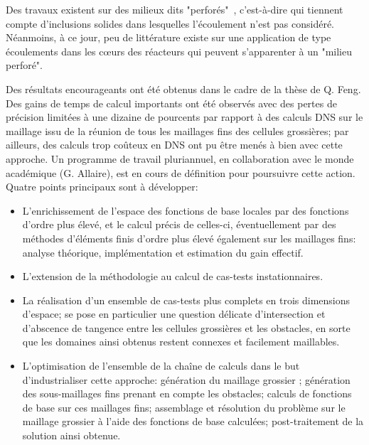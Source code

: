 Des travaux existent sur des milieux dits "perfor\'es"~\cite{Chung}, c'est-\`a-dire qui tiennent compte d'inclusions solides dans lesquelles l'\'ecoulement n'est pas consid\'er\'e. N\'eanmoins, \`a ce jour, peu de litt\'erature existe sur une application de type \'ecoulements dans les c{\oe}urs des r\'eacteurs qui peuvent s'apparenter \`a un "milieu perfor\'e". 

Des r\'esultats encourageants ont \'et\'e obtenus dans le cadre de la th\`ese de Q. Feng. Des gains de temps de calcul importants ont \'et\'e observ\'es avec des pertes de pr\'ecision limit\'ees \`a une dizaine de pourcents par rapport \`a des calculs DNS sur le maillage issu de la r\'eunion de tous les maillages fins des cellules grossi\`eres; par ailleurs, des calculs trop co\^uteux en DNS ont pu \^etre men\'es \`a bien avec cette approche. Un programme de travail pluriannuel, en collaboration avec le monde acad\'emique (G. Allaire), est en cours de d\'efinition pour poursuivre cette action. Quatre points principaux sont \`a d\'evelopper:
\begin{itemize}
\item L'enrichissement de l'espace des fonctions de base locales par des fonctions d'ordre plus \'elev\'e, et le calcul pr\'ecis de celles-ci, \'eventuellement par des m\'ethodes d'\'el\'ements finis d'ordre plus \'elev\'e \'egalement sur les maillages fins: analyse th\'eorique, impl\'ementation et estimation du gain effectif.
\item L'extension de la m\'ethodologie au calcul de cas-tests instationnaires.
\item La r\'ealisation d'un ensemble de cas-tests plus complets en trois dimensions d'espace; se pose en particulier une question d\'elicate d'intersection et d'abscence de tangence entre les cellules grossi\`eres et les obstacles, en sorte que les domaines ainsi obtenus restent connexes et facilement maillables.
\item  L'optimisation de l'ensemble de la cha\^ine de calculs dans le but d'industrialiser cette approche: g\'en\'eration du maillage grossier ; g\'en\'eration des sous-maillages fins prenant en compte les obstacles; calculs de fonctions de base sur ces maillages fins; assemblage et r\'esolution du probl\`eme sur le maillage grossier \`a l'aide des fonctions de base calcul\'ees; post-traitement de la solution ainsi obtenue.
\end{itemize}

